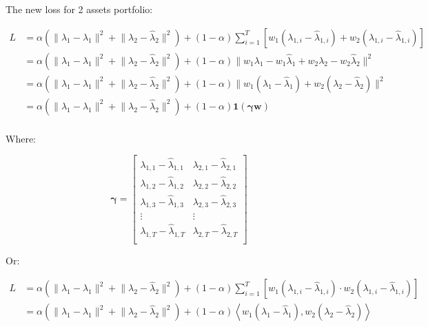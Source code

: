 \documentclass{article}
\begin{document}
The new loss for 2 assets portfolio:


\begin{align*}
    L &=
    \alpha
    \left(
        \lVert \lambda_1 - \hat{\lambda}_1 \rVert^2
        + \lVert \lambda_2 - \hat{\lambda}_2 \rVert^2
    \right)
    + (1 - \alpha)
            \sum_{i = 1}^{T}
            \left[
                w_1 (\lambda_{1, i} - \hat{\lambda}_{1, i}) + w_2 (\lambda_{1, i} - \hat{\lambda}_{1, i})
            \right] 
    \\
    &= \alpha
    \left(
        \lVert \lambda_1 - \hat{\lambda}_1 \rVert^2
        + \lVert \lambda_2 - \hat{\lambda}_2 \rVert^2
    \right)
    + (1 - \alpha)
        \lVert w_1 \lambda_1 - w_1 \hat{\lambda}_1 + w_2 \lambda_2 - w_2 \hat{\lambda}_2 \rVert^2
    \\
    &= \alpha
    \left(
        \lVert \lambda_1 - \hat{\lambda}_1 \rVert^2
        + \lVert \lambda_2 - \hat{\lambda}_2 \rVert^2
    \right)
    + (1 - \alpha)
        \lVert w_1 (\lambda_1 - \hat{\lambda}_1) + w_2 (\lambda_2 - \hat{\lambda}_2) \rVert^2
    \\
    &= \alpha
    \left(
        \lVert \lambda_1 - \hat{\lambda}_1 \rVert^2
        + \lVert \lambda_2 - \hat{\lambda}_2 \rVert^2
    \right)
    + (1 - \alpha)
    \mathbf{1} (\mathbf{\gamma} \mathbf{w})
    \\
\end{align*}


Where:

$$
\mathbf{\gamma} = \left[
\begin{matrix}
        \lambda_{1, 1} - \hat{\lambda}_{1, 1} & \lambda_{2, 1} - \hat{\lambda}_{2, 1} \\
        \lambda_{1, 2} - \hat{\lambda}_{1, 2} & \lambda_{2, 2} - \hat{\lambda}_{2, 2} \\
        \lambda_{1, 3} - \hat{\lambda}_{1, 3} & \lambda_{2, 3} - \hat{\lambda}_{2, 3} \\
        \vdots & \vdots \\
        \lambda_{1, T} - \hat{\lambda}_{1, T} & \lambda_{2, T} - \hat{\lambda}_{2, T} \\
\end{matrix}
\right]
$$

Or:

\begin{align*}
    L &=
    \alpha
    \left(
        \lVert \lambda_1 - \hat{\lambda}_1 \rVert^2
        + \lVert \lambda_2 - \hat{\lambda}_2 \rVert^2
    \right)
    + (1 - \alpha)
        \sum_{i = 1}^{T} \left[
            w_1 (\lambda_{1, i} - \hat{\lambda}_{1, i}) \cdot w_2 (\lambda_{1, i} - \hat{\lambda}_{1, i})
        \right]
    \\
    &= \alpha
    \left(
        \lVert \lambda_1 - \hat{\lambda}_1 \rVert^2
        + \lVert \lambda_2 - \hat{\lambda}_2 \rVert^2
    \right)
    + (1 - \alpha)
        \left< w_1 (\lambda_1 - \hat{\lambda}_1), w_2 (\lambda_2 - \hat{\lambda}_2) \right>
\end{align*}
\end{document}
